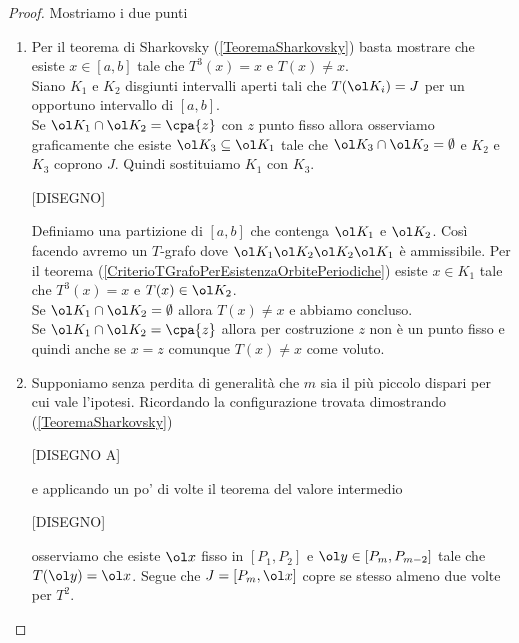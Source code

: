\begin{proof}
Mostriamo i due punti
\setlength{\leftmargini}{0cm}
\begin{enumerate}
\item Per il teorema di Sharkovsky (\ref{TeoremaSharkovsky}) basta mostrare che esiste $x\in [a,b]$ tale che $T^3(x)=x$ e $T(x)\neq x$.\\ 
Siano $K_1$ e $K_2$ disgiunti intervalli aperti tali che $T(\ol K_i)=J$ per un opportuno intervallo di $[a,b]$.\\
Se $\ol K_1\cap \ol K_2=\cpa{z}$ con $z$ punto fisso allora osserviamo graficamente che esiste $\ol K_3\subseteq \ol K_1$ tale che $\ol K_3\cap \ol K_2=\emptyset$ e $K_2$ e $K_3$ coprono $J$. Quindi sostituiamo $K_1$ con $K_3$.

[DISEGNO]

Definiamo una partizione di $[a,b]$ che contenga $\ol K_1$ e $\ol K_2$. Cos\`i facendo avremo un $T$-grafo dove $\ol K_1\ol K_2\ol K_2\ol K_1$ \`e ammissibile. Per il teorema (\ref{CriterioTGrafoPerEsistenzaOrbitePeriodiche}) esiste $x\in K_1$ tale che $T^3(x)=x$ e $T(x)\in \ol K_2$.\\
Se $\ol K_1\cap \ol K_2=\emptyset$ allora $T(x)\neq x$ e abbiamo concluso.\\
Se $\ol K_1\cap \ol K_2=\cpa{z}$ allora per costruzione $z$ non \`e un punto fisso e quindi anche se $x=z$ comunque $T(x)\neq x$ come voluto.
\item Supponiamo senza perdita di generalit\`a che $m$ sia il pi\`u piccolo dispari per cui vale l'ipotesi. Ricordando la configurazione trovata dimostrando (\ref{TeoremaSharkovsky})

[DISEGNO A]

e applicando un po' di volte il teorema del valore intermedio

[DISEGNO]

osserviamo che esiste $\ol x$ fisso in $[P_1,P_2]$ e $\ol y\in [P_{m},P_{m-2}]$ tale che $T(\ol y)=\ol x$. Segue che $J=[P_m,\ol x]$ copre se stesso almeno due volte per $T^2$.
\end{enumerate}
\setlength{\leftmargini}{0.5cm}
\end{proof}



